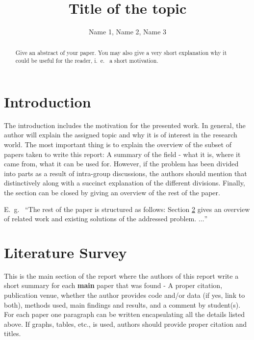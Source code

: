 \documentclass[]{tukseminar}
\title{Title of the topic}
\author{Name 1, Name 2, Name 3
  \institute{Technische Universität Kaiserslautern, Department of Computer Science}}
\begin{document}

\maketitle


\begin{abstract}
    Give an abstract of your paper. You may also give a very short explanation why it could be useful for the reader, i.~e.~ a short motivation.
\end{abstract}


\section{Introduction}
\label{sec:introduction}

The introduction includes the motivation for the presented work.
In general, the author will explain the assigned topic and why it is of interest in the research world.
The most important thing is to explain the overview of the subset of papers taken to write this report: A summary of the field - what it is, where it came from, what it can be used for. However, if the problem has been divided into parts as a result of intra-group discussions, the authors should mention that distinctively along with a succinct explanation of the different divisions.
Finally, the section can be closed by giving an overview of the rest of the paper.\

E.~g.~ ``The rest of the paper is structured as follows:
Section \ref{sec:literatureSurvey} gives an overview of related work and existing solutions of the addressed problem. $\ldots$''

\section{Literature Survey}
\label{sec:literatureSurvey}

This is the main section of the report where the authors of this report write a short summary for each \textbf{main} paper that was found - A proper citation,
publication venue, whether the author provides code and/or data (if yes, link to
both), methods used, main findings and results, and a comment by student(s). For each paper one paragraph can be written encapsulating all the details listed above. If graphs, tables, etc., is used, authors should provide proper citation and titles. 
\end{document}
